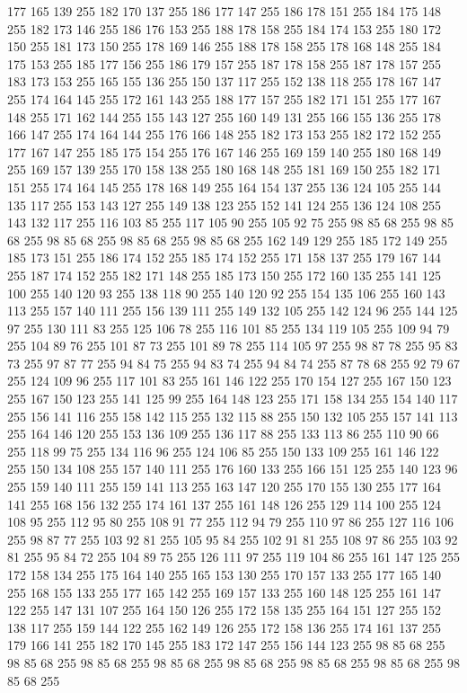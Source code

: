 177 165 139 255 182 170 137 255 186 177 147 255 186 178 151 255 184 175 148 255 182 173 146 255 186 176 153 255 188 178 158 255 184 174 153 255 180 172 150 255 181 173 150 255 178 169 146 255 188 178 158 255 178 168 148 255 184 175 153 255 185 177 156 255 186 179 157 255 187 178 158 255 187 178 157 255 183 173 153 255 165 155 136 255 150 137 117 255 152 138 118 255 178 167 147 255 174 164 145 255 172 161 143 255 188 177 157 255 182 171 151 255 177 167 148 255 171 162 144 255 155 143 127 255 160 149 131 255 166 155 136 255 178 166 147 255 174 164 144 255 176 166 148 255 182 173 153 255 182 172 152 255 177 167 147 255 185 175 154 255 176 167 146 255 169 159 140 255 180 168 149 255 169 157 139 255 170 158 138 255 180 168 148 255 181 169 150 255 182 171 151 255 174 164 145 255 178 168 149 255 164 154 137 255 136 124 105 255 144 135 117 255 153 143 127 255 149 138 123 255 152 141 124 255 136 124 108 255 143 132 117 255 116 103 85 255 117 105 90 255 105 92 75 255 98 85 68 255 98 85 68 255 98 85 68 255
98 85 68 255 98 85 68 255 162 149 129 255 185 172 149 255 185 173 151 255 186 174 152 255 185 174 152 255 171 158 137 255 179 167 144 255 187 174 152 255 182 171 148 255 185 173 150 255 172 160 135 255 141 125 100 255 140 120 93 255 138 118 90 255 140 120 92 255 154 135 106 255 160 143 113 255 157 140 111 255 156 139 111 255 149 132 105 255 142 124 96 255 144 125 97 255 130 111 83 255 125 106 78 255 116 101 85 255 134 119 105 255 109 94 79 255 104 89 76 255 101 87 73 255 101 89 78 255 114 105 97 255 98 87 78 255 95 83 73 255 97 87 77 255 94 84 75 255 94 83 74 255 94 84 74 255 87 78 68 255 92 79 67 255 124 109 96 255 117 101 83 255 161 146 122 255 170 154 127 255 167 150 123 255 167 150 123 255 141 125 99 255 164 148 123 255 171 158 134 255 154 140 117 255 156 141 116 255 158 142 115 255 132 115 88 255 150 132 105 255 157 141 113 255 164 146 120 255 153 136 109 255 136 117 88 255 133 113 86 255 110 90 66 255 118 99 75 255 134 116 96 255 124 106 85 255
150 133 109 255 161 146 122 255 150 134 108 255 157 140 111 255 176 160 133 255 166 151 125 255 140 123 96 255 159 140 111 255 159 141 113 255 163 147 120 255 170 155 130 255 177 164 141 255 168 156 132 255 174 161 137 255 161 148 126 255 129 114 100 255 124 108 95 255 112 95 80 255 108 91 77 255 112 94 79 255 110 97 86 255 127 116 106 255 98 87 77 255 103 92 81 255 105 95 84 255 102 91 81 255 108 97 86 255 103 92 81 255 95 84 72 255 104 89 75 255 126 111 97 255 119 104 86 255 161 147 125 255 172 158 134 255 175 164 140 255 165 153 130 255 170 157 133 255 177 165 140 255 168 155 133 255 177 165 142 255 169 157 133 255 160 148 125 255 161 147 122 255 147 131 107 255 164 150 126 255 172 158 135 255 164 151 127 255 152 138 117 255 159 144 122 255 162 149 126 255 172 158 136 255 174 161 137 255 179 166 141 255 182 170 145 255 183 172 147 255 156 144 123 255 98 85 68 255 98 85 68 255 98 85 68 255 98 85 68 255 98 85 68 255 98 85 68 255 98 85 68 255 98 85 68 255
